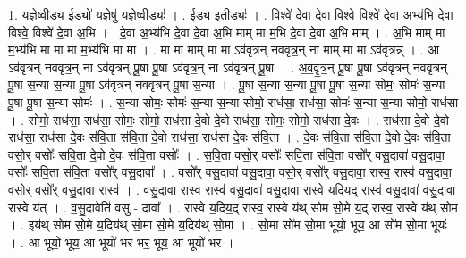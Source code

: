\documentclass[17pt]{extarticle}
\begin{document}
1. य॒ज्ञेष्वीड्य॒ ईड्यो॑ य॒ज्ञेषु॑ य॒ज्ञेष्वीड्यः॑ । . ईड्य॒ इतीड्यः॑ । . विश्वे॑ दे॒वा दे॒वा विश्वे॒ विश्वे॑ दे॒वा अ॒भ्य॑भि दे॒वा विश्वे॒ विश्वे॑ दे॒वा अ॒भि । . दे॒वा अ॒भ्य॑भि दे॒वा दे॒वा अ॒भि माम् मा म॒भि दे॒वा दे॒वा अ॒भि माम् । . अ॒भि माम् मा म॒भ्य॑भि मा मा मा म॒भ्य॑भि मा मा । . मा मा माम् मा मा ऽव॑वृत्रन् नववृत्र॒न् ना माम् मा मा ऽव॑वृत्रन्न् । . आ ऽव॑वृत्रन् नववृत्र॒न् ना ऽव॑वृत्रन् पू॒षा पू॒षा ऽव॑वृत्र॒न् ना ऽव॑वृत्रन् पू॒षा । . अ॒व॒वृ॒त्र॒न् पू॒षा पू॒षा ऽव॑वृत्रन् नववृत्रन् पू॒षा स॒न्या स॒न्या पू॒षा ऽव॑वृत्रन् नववृत्रन् पू॒षा स॒न्या । . पू॒षा स॒न्या स॒न्या पू॒षा पू॒षा स॒न्या सोमः॒ सोमः॑ स॒न्या पू॒षा पू॒षा स॒न्या सोमः॑ । . स॒न्या सोमः॒ सोमः॑ स॒न्या स॒न्या सोमो॒ राध॑सा॒ राध॑सा॒ सोमः॑ स॒न्या स॒न्या सोमो॒ राध॑सा । . सोमो॒ राध॑सा॒ राध॑सा॒ सोमः॒ सोमो॒ राध॑सा दे॒वो दे॒वो राध॑सा॒ सोमः॒ सोमो॒ राध॑सा दे॒वः । . राध॑सा दे॒वो दे॒वो राध॑सा॒ राध॑सा दे॒वः स॑वि॒ता स॑वि॒ता दे॒वो राध॑सा॒ राध॑सा दे॒वः स॑वि॒ता । . दे॒वः स॑वि॒ता स॑वि॒ता दे॒वो दे॒वः स॑वि॒ता वसो॒र् वसोः᳚ सवि॒ता दे॒वो दे॒वः स॑वि॒ता वसोः᳚ । . स॒वि॒ता वसो॒र् वसोः᳚ सवि॒ता स॑वि॒ता वसो᳚र् वसु॒दावा॑ वसु॒दावा॒ वसोः᳚ सवि॒ता स॑वि॒ता वसो᳚र् वसु॒दावा᳚ । . वसो᳚र् वसु॒दावा॑ वसु॒दावा॒ वसो॒र् वसो᳚र् वसु॒दावा॒ रास्व॒ रास्व॑ वसु॒दावा॒ वसो॒र् वसो᳚र् वसु॒दावा॒ रास्व॑ । . व॒सु॒दावा॒ रास्व॒ रास्व॑ वसु॒दावा॑ वसु॒दावा॒ रास्वे य॒दिय॒द् रास्व॑ वसु॒दावा॑ वसु॒दावा॒ रास्वे य॑त् । . व॒सु॒दावेति॑ वसु - दावा᳚ । . रास्वे य॒दिय॒द् रास्व॒ रास्वे य॑थ् सोम सो॒मे य॒द् रास्व॒ रास्वे य॑थ् सोम । . इय॑थ् सोम सो॒मे य॒दिय॑थ् सो॒मा सो॒मे य॒दिय॑थ् सो॒मा । . सो॒मा सो॑म सो॒मा भूयो॒ भूय॒ आ सो॑म सो॒मा भूयः॑ । . आ भूयो॒ भूय॒ आ भूयो॑ भर भर॒ भूय॒ आ भूयो॑ भर । \newline
\end{document}
